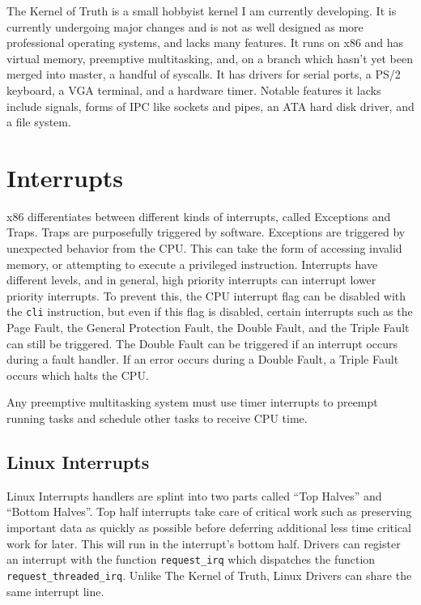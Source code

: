 \documentclass[10pt,conference,draftclsnofoot,onecolumn]{IEEEtran}
\begin{document}
The Kernel of Truth is a small hobbyist kernel I am currently developing. It is currently undergoing major changes and is not as well designed as more professional operating systems, and lacks many features. It runs on x86 and has virtual memory, preemptive multitasking, and, on a branch which hasn't yet been merged into master, a handful of syscalls. It has drivers for serial ports, a PS/2 keyboard, a VGA terminal, and a hardware timer. Notable features it lacks include signals, forms of IPC like sockets and pipes, an ATA hard disk driver, and a file system\cite{4_kronquist_2016}.

\section{Interrupts}
x86 differentiates between different kinds of interrupts, called Exceptions and Traps. Traps are purposefully triggered by software. Exceptions are triggered by unexpected behavior from the CPU. This can take the form of accessing invalid memory, or attempting to execute a privileged instruction. Interrupts have different levels, and in general, high priority interrupts can interrupt lower priority interrupts. To prevent this, the CPU interrupt flag can be disabled with the \texttt{cli} instruction, but even if this flag is disabled, certain interrupts such as the Page Fault, the General Protection Fault, the Double Fault, and the Triple Fault can still be triggered. The Double Fault can be triggered if an interrupt occurs during a fault handler. If an error occurs during a Double Fault, a Triple Fault occurs which halts the CPU.

Any preemptive multitasking system must use timer interrupts to preempt running tasks and schedule other tasks to receive CPU time.

\subsection{Linux Interrupts}
Linux Interrupts handlers are splint into two parts called ``Top Halves'' and ``Bottom Halves''. Top half interrupts take care of critical work such as preserving important data as quickly as possible before deferring additional less time critical work for later. This will run in the interrupt's bottom half. Drivers can register an interrupt with the function \texttt{request\_irq} which dispatches the function \texttt{request\_threaded\_irq}. Unlike The Kernel of Truth, Linux Drivers can share the same interrupt line.
\end{document}
